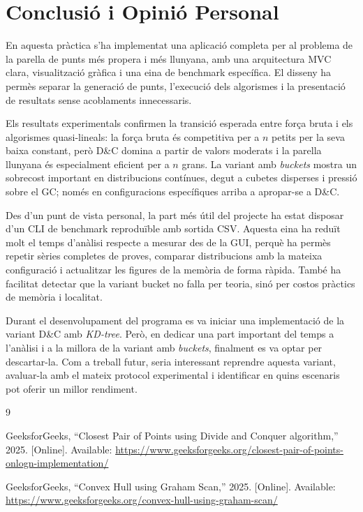 \documentclass[conference,compsoc]{IEEEtran}
\begin{document}
\section{Conclusió i Opinió Personal}

En aquesta pràctica s'ha implementat una aplicació completa per al problema
de la parella de punts més propera i més llunyana, amb una arquitectura MVC
clara, visualització gràfica i una eina de benchmark específica. El disseny
ha permès separar la generació de punts, l'execució dels algorismes i la
presentació de resultats sense acoblaments innecessaris.

Els resultats experimentals confirmen la transició esperada entre força bruta
i els algorismes quasi-lineals: la força bruta és competitiva per a $n$ petits
 per la seva baixa constant, però D\&C domina a partir de valors moderats i la
 parella llunyana és especialment eficient per a $n$ grans. La variant amb
 \textit{buckets} mostra un sobrecost important en distribucions contínues,
 degut a cubetes disperses i pressió sobre el GC; només en configuracions
 específiques arriba a apropar-se a D\&C.

Des d'un punt de vista personal, la part més útil del projecte ha estat
disposar d'un CLI de benchmark reproduïble amb sortida CSV. Aquesta eina ha
reduït molt el temps d'anàlisi respecte a mesurar des de la GUI, perquè ha
permès repetir sèries completes de proves, comparar distribucions amb la
mateixa configuració i actualitzar les figures de la memòria de forma ràpida.
També ha facilitat detectar que la variant bucket no falla per teoria, sinó
per costos pràctics de memòria i localitat.

Durant el desenvolupament del programa es va
iniciar una implementació de la variant D\&C amb \textit{KD-tree}. Però,
en dedicar una part important del temps a l'anàlisi i a la millora de la
variant amb \textit{buckets}, finalment es va optar per descartar-la.
Com a treball futur, seria interessant reprendre aquesta variant,
avaluar-la amb el mateix protocol experimental i identificar en quins escenaris
pot oferir un millor rendiment.


\begin{thebibliography}{9}

GeeksforGeeks, ``Closest Pair of Points using Divide and Conquer algorithm,''
2025. [Online]. Available:
\url{https://www.geeksforgeeks.org/closest-pair-of-points-onlogn-implementation/}

GeeksforGeeks, ``Convex Hull using Graham Scan,''
2025. [Online]. Available:
\url{https://www.geeksforgeeks.org/convex-hull-using-graham-scan/}

\end{thebibliography}
\end{document}
